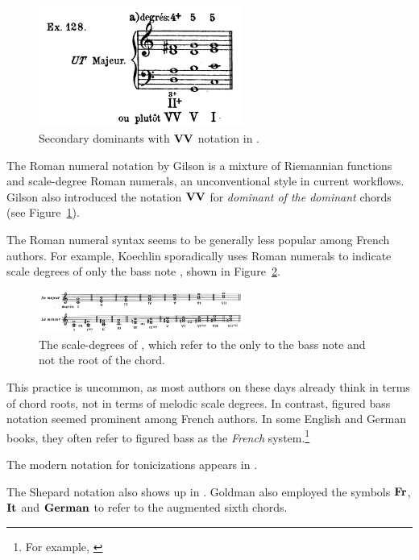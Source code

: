 \begin{figure}[h!]
    \centering
    \includegraphics[width=0.6\textwidth]{figures/chapter/2/primary_sources/gilson1919traite090.png}
    \caption{Secondary dominants with $\textbf{VV}\relax\relax$ notation in \textcite{gilson1919traite}.}
    \label{fig:gilson1919traite090}
\end{figure}

The Roman numeral notation by Gilson is a mixture of Riemannian functions and scale-degree Roman numerals, an unconventional style in current workflows.
Gilson also introduced the notation $\textbf{VV}\relax\relax$ for \emph{dominant of the dominant} chords (see Figure~\ref{fig:gilson1919traite090}).

The Roman numeral syntax seems to be generally less popular among French authors.
For example, Koechlin sporadically uses Roman numerals to indicate scale degrees of only the bass note \textcite{koechlin1928traite}, shown in Figure~\ref{fig:koechlin1928traite026}.

\begin{figure}[h!]
    \centering
    \includegraphics[width=0.6\textwidth]{figures/chapter/2/primary_sources/koechlin1928traite026.png}
    \caption{The scale-degrees of \textcite{koechlin1928traite}, which refer to the only to the bass note and not the root of the chord.}
    \label{fig:koechlin1928traite026}
\end{figure}

This practice is uncommon, as most authors on these days already think in terms of chord roots, not in terms of melodic scale degrees.
In contrast, figured bass notation seemed prominent among French authors.
In some English and German books, they often refer to figured bass as the \emph{French} system.\footnote{For example, \textcite{norris1894practical}}

The modern notation for tonicizations appears in \textcite{tischler1964practical}.

The Shepard notation also shows up in \textcite{goldman1965harmony}.
Goldman also employed the symbols $\textbf{Fr}\relax\relax$, $\textbf{It}\relax\relax$ and $\textbf{German}\relax\relax$ to refer to the augmented sixth chords.

